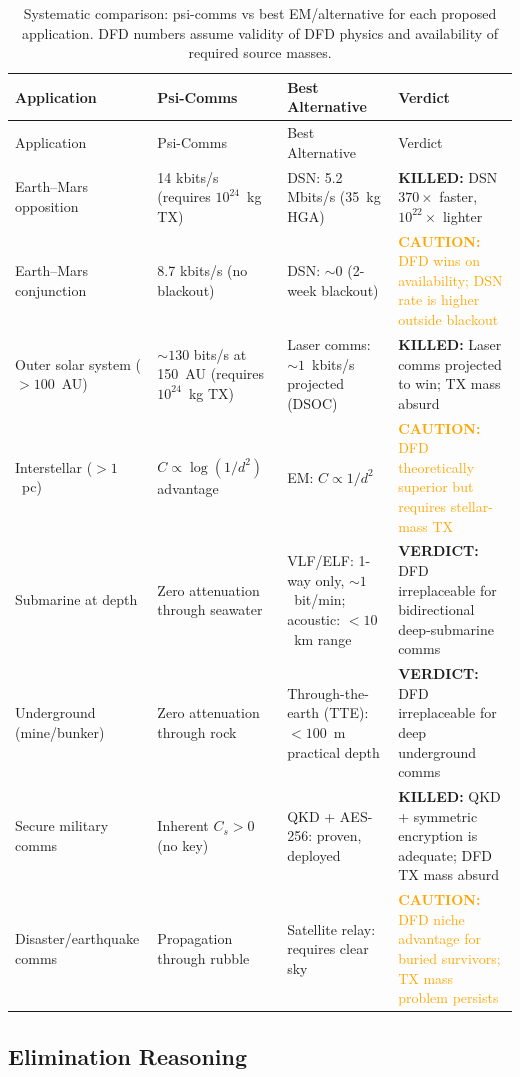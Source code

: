 \documentclass[11pt]{article}
\theoremstyle{definition}
\theoremstyle{remark}
\newcommand{\caution}[1]{\textcolor{orange}{\textbf{CAUTION:} #1}}
\newcommand{\killed}[1]{\textcolor{red!70!black}{\textbf{KILLED:} #1}}
\newcommand{\verdict}[1]{\textcolor{green!50!black}{\textbf{VERDICT:} #1}}
\begin{document}
\begin{longtable}{@{}p{3.8cm}p{3.5cm}p{3.5cm}p{3cm}@{}}
\caption{Systematic comparison: psi-comms vs best EM/alternative for
each proposed application. DFD numbers assume validity of DFD physics
and availability of required source masses.}
\label{tab:application_elimination}\\
\toprule
Application & Psi-Comms & Best Alternative & Verdict \\
\midrule
\endfirsthead
\toprule
Application & Psi-Comms & Best Alternative & Verdict \\
\midrule
\endhead
\bottomrule
\endlastfoot
%
Earth--Mars opposition & 14 kbits/s (requires $10^{24}$~kg TX) &
  DSN: 5.2 Mbits/s (35~kg HGA) & \killed{DSN $370\times$ faster, $10^{22}\times$ lighter} \\
\midrule
Earth--Mars conjunction & 8.7 kbits/s (no blackout) &
  DSN: $\sim 0$ (2-week blackout) &
  \caution{DFD wins on availability; DSN rate is higher outside blackout} \\
\midrule
Outer solar system ($>100$~AU) & $\sim 130$ bits/s at 150~AU
  (requires $10^{24}$~kg TX) &
  Laser comms: $\sim 1$~kbits/s projected (DSOC) &
  \killed{Laser comms projected to win; TX mass absurd} \\
\midrule
Interstellar ($>1$~pc) & $C \propto \log(1/d^2)$ advantage &
  EM: $C \propto 1/d^2$ &
  \caution{DFD theoretically superior but requires stellar-mass TX} \\
\midrule
Submarine at depth & Zero attenuation through seawater &
  VLF/ELF: 1-way only, $\sim 1$~bit/min; acoustic: $<10$~km range &
  \verdict{DFD irreplaceable for bidirectional deep-submarine comms} \\
\midrule
Underground (mine/bunker) & Zero attenuation through rock &
  Through-the-earth (TTE): $<100$~m practical depth &
  \verdict{DFD irreplaceable for deep underground comms} \\
\midrule
Secure military comms & Inherent $C_s > 0$ (no key) &
  QKD + AES-256: proven, deployed &
  \killed{QKD + symmetric encryption is adequate; DFD TX mass absurd} \\
\midrule
Disaster/earthquake comms & Propagation through rubble &
  Satellite relay: requires clear sky &
  \caution{DFD niche advantage for buried survivors; TX mass problem persists} \\
\bottomrule
\end{longtable}

\subsection{Elimination Reasoning}
\end{document}
